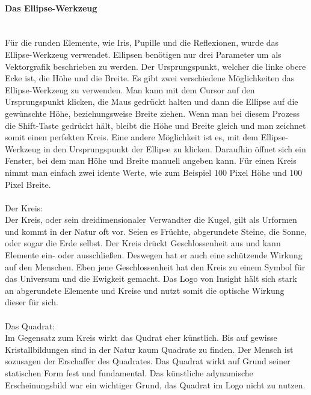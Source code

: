 \paragraph{Das Ellipse-Werkzeug}
\leavevmode \\
Für die runden Elemente, wie Iris, Pupille und die Reflexionen, wurde das Ellipse-Werkzeug verwendet. Ellipsen benötigen nur drei Parameter um als Vektorgrafik beschrieben zu werden. Der Ursprungspunkt, welcher die linke obere Ecke ist, die Höhe und die Breite. Es gibt zwei verschiedene Möglichkeiten das Ellipse-Werkzeug zu verwenden. Man kann mit dem Cursor auf den Ursprungspunkt klicken, die Maus gedrückt halten und dann die Ellipse auf die gewünschte Höhe, beziehungsweise Breite ziehen. Wenn man bei diesem Prozess die Shift-Taste gedrückt hält, bleibt die Höhe und Breite gleich und man zeichnet somit einen perfekten Kreis. Eine andere Möglichkeit ist es, mit dem Ellipse-Werkzeug in den Ursprungspunkt der Ellipse zu klicken. Daraufhin öffnet sich ein Fenster, bei dem man Höhe und Breite manuell angeben kann. Für einen Kreis nimmt man einfach zwei idente Werte, wie zum Beispiel 100 Pixel Höhe und 100 Pixel Breite.\cite{ellipse}
\leavevmode \\
\leavevmode \\
Der Kreis:
\leavevmode \\
Der Kreis, oder sein dreidimensionaler Verwandter die Kugel, gilt als Urformen und kommt in der Natur oft vor. Seien es Früchte, abgerundete Steine, die Sonne, oder sogar die Erde selbst. Der Kreis drückt Geschlossenheit aus und kann Elemente ein- oder ausschließen. Deswegen hat er auch eine schützende Wirkung auf den Menschen. Eben jene Geschlossenheit hat den Kreis zu einem Symbol für das Universum und die Ewigkeit gemacht.\cite{kreiswirk} Das Logo von Insight hält sich stark an abgerundete Elemente und Kreise und nutzt somit die optische Wirkung dieser für sich.
\leavevmode \\
\leavevmode \\
Das Quadrat:
\leavevmode \\
Im Gegensatz zum Kreis wirkt das Qudrat eher künstlich. Bis auf gewisse Kristallbildungen sind in der Natur kaum Quadrate zu finden. Der Mensch ist sozusagen der Erschaffer des Quadrates. Das Quadrat wirkt auf Grund seiner statischen Form fest und fundamental.\cite{quawirk} Das künstliche adynamische Erscheinungsbild war ein wichtiger Grund, das Quadrat im Logo nicht zu nutzen.
\leavevmode \\

